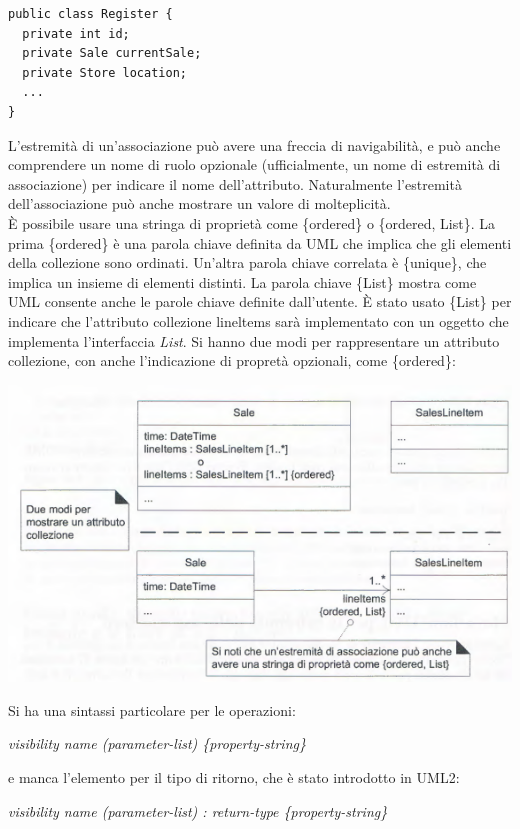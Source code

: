 \documentclass[a4paper,12pt, oneside]{book}
\begin{document}
\begin{verbatim}
public class Register {
  private int id;
  private Sale currentSale;
  private Store location;
  ...
}
\end{verbatim}
L'estremità di un'associazione può avere una freccia di navigabilità, e può anche comprendere un nome di ruolo opzionale (ufficialmente, un nome di estremità di associazione) per indicare il nome dell'attributo. Naturalmente l'estremità dell'associazione può anche mostrare un valore di molteplicità.\\
È possibile usare una stringa di proprietà come \{ordered\} o \{ordered, List\}. La prima \{ordered\} è una parola chiave definita da UML che
implica che gli elementi della collezione sono ordinati. Un'altra parola chiave correlata è
\{unique\}, che implica un insieme di elementi distinti.
La parola chiave \{List\} mostra come UML consente anche le parole chiave definite dall'utente. È stato usato \{List\} per indicare che l'attributo collezione lineltems sarà implementato con un oggetto che implementa l'interfaccia \textit{List}. Si hanno due modi per rappresentare un attributo collezione, con anche l'indicazione di propretà opzionali, come \{ordered\}:
\begin{center}
	\includegraphics[scale=0.7]{img/clasd6.png}
\end{center}
Si ha una sintassi particolare per le operazioni:
\begin{center}
	\textit{visibility name (parameter-list) \{property-string\}}
\end{center}
e manca l'elemento per il tipo di ritorno, che è stato introdotto in UML2:
\begin{center}
	\textit{visibility name (parameter-list) : return-type \{property-string\}}
\end{center}
\end{document}
